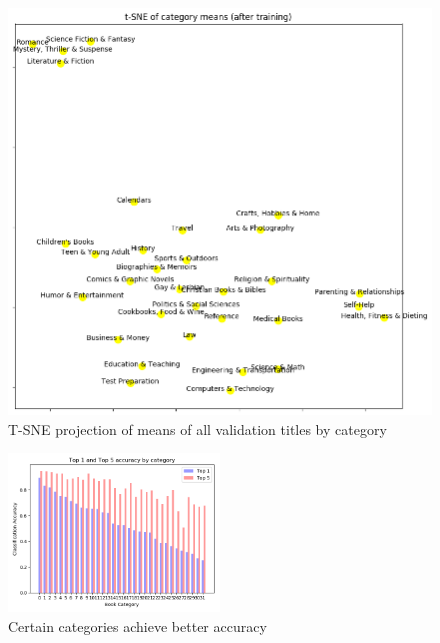 \documentclass[jou,apacite, 10px]{apa6}
\begin{document}
\begin{figure}[h!]
    \captionsetup{justification=centering}
    \centering
      \includegraphics[width=\columnwidth]{images/tsne-categories}
    \caption{T-SNE projection of means of all validation titles by category}
      \label{tsne_categories}
  \end{figure}



\onecolumn

\begin{figure}[h!]
    \captionsetup{justification=centering}
        \centering
            \includegraphics[width=0.5\textwidth]{images/Category_Top1_Top5}
            \caption{Certain categories achieve better accuracy}
    \end{figure}



\twocolumn


\end{document}
